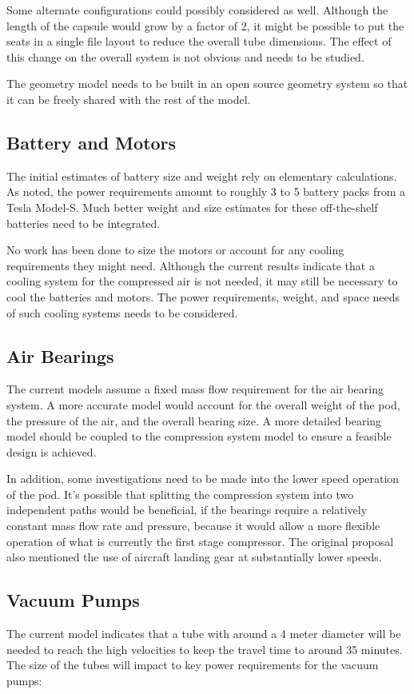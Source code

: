 \documentclass[heading.tex]{subfiles}
\begin{document}
Some alternate configurations could possibly considered as well. Although the length of the capsule would grow by a factor of 2, it
might be possible to put the seats in a single file layout to reduce the overall tube dimensions. The effect of this change on the overall
system is not obvious and needs to be studied.

The geometry model needs to be built in an open source geometry system so that it can be freely shared with the rest of the model.

\subsection{Battery and Motors}
The initial estimates of battery size and weight rely on elementary calculations. As noted, the power requirements amount to roughly
3 to 5 battery packs from a Tesla Model-S. Much better weight and size estimates for these off-the-shelf batteries need to be integrated.

No work has been done to size the motors or account for any cooling requirements they might need. Although the current results indicate
that a cooling system for the compressed air is not needed, it may still be necessary to cool the batteries and motors. The power
requirements, weight, and space needs of such cooling systems needs to be considered.

\subsection{Air Bearings}
The current models assume a fixed mass flow requirement for the air bearing system. A more accurate model would account for the overall
weight of the pod, the pressure of the air, and the overall bearing size. A more detailed bearing model should be coupled to the
compression system model to ensure a feasible design is achieved.

In addition, some investigations need to be made into the lower speed operation of the pod. It's possible that splitting the compression
system into two independent paths would be beneficial, if the bearings require a relatively constant mass flow rate and pressure, because it
would allow a more flexible operation of what is currently the first stage compressor.
The original proposal also mentioned the use of aircraft landing gear at substantially lower speeds.


\subsection{Vacuum Pumps}
The current model indicates that a tube with around a 4 meter diameter will be needed to reach the high velocities to keep the travel time
to around 35 minutes. The size of the tubes will impact to key power requirements for the vacuum pumps:
\end{document}
